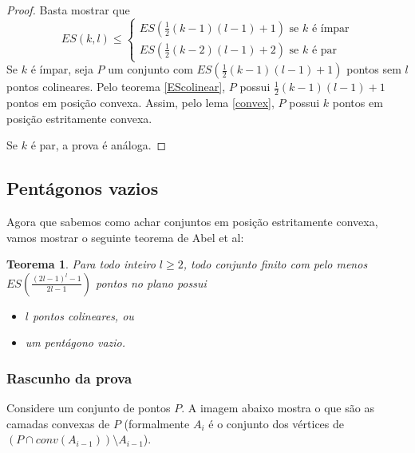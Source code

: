 \documentclass[a4paper]{book}
\newtheorem{teorema}{Teorema}
\begin{document}
\begin{proof}
    Basta mostrar que
    $$
    ES(k,l)\leq
    \begin{cases}
        ES(\frac{1}{2}(k-1)(l-1)+1) \text{ se }k\text{ é ímpar}\\
        ES(\frac{1}{2}(k-2)(l-1)+2) \text{ se }k\text{ é par}
    \end{cases}$$
    Se $k$ é ímpar, seja $P$ um conjunto com $ES(\frac{1}{2}(k-1)(l-1)+1)$ pontos sem $l$ pontos colineares. Pelo teorema \ref{EScolinear}, $P$ possui $\frac{1}{2}(k-1)(l-1)+1$ pontos em posição convexa. Assim, pelo lema \ref{convex}, $P$ possui $k$ pontos em posição estritamente convexa.

    Se $k$ é par, a prova é análoga.
\end{proof}

\subsection{Pentágonos vazios}

Agora que sabemos como achar conjuntos em posição estritamente convexa, vamos mostrar o seguinte teorema de Abel et al\cite{pentagon}:

\begin{teorema}
    Para todo inteiro $l\geq 2$, todo conjunto finito com pelo menos $ES(\frac{(2l-1)^l-1}{2l-1})$ pontos no plano possui 
    \begin{itemize}
        \item $l$ pontos colineares, ou
        \item um pentágono vazio.
    \end{itemize}
\end{teorema}
\subsubsection {Rascunho da prova}
Considere um conjunto de pontos $P$. A imagem abaixo mostra o que são as camadas convexas de $P$ (formalmente $A_i$ é o conjunto dos vértices de $(P\cap conv(A_{i-1})) \setminus A_{i-1}$).

\end{document}
